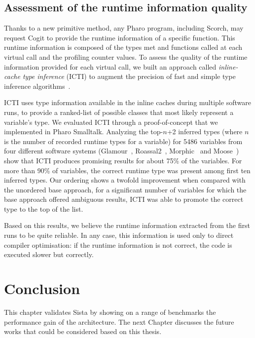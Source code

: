 \documentclass[a4paper,12pt,twoside]{../includes/ThesisStyle}
\begin{document}
\subsection{Assessment of the runtime information quality}

Thanks to a new primitive method, any Pharo program, including Scorch, may request Cogit to provide the runtime information of a specific function. This runtime information is composed of the types met and functions called at each virtual call and the profiling counter values. To assess the quality of the runtime information provided for each virtual call, we built an approach called \emph{inline-cache type inference} (ICTI) to augment the precision of fast and simple type inference algorithms~\cite{Milo16a}. 

ICTI uses type information available in the inline caches during multiple software runs, to provide a ranked-list of possible classes that most likely represent a variable's type. We evaluated ICTI through a proof-of-concept that we implemented in Pharo Smalltalk. Analyzing the top-$n$+2 inferred types (where $n$ is the number of recorded runtime types for a variable) for 5486 variables from four different software systems (Glamour~\cite{Bung09a}, Roassal2~\cite{Pena13a}, Morphic~\cite{Fern07y} and Moose~\cite{Girb10a, Duca05a, Duca00b}) show that ICTI produces promising results for about 75\% of the variables. For more than 90\% of variables, the correct runtime type was present among first ten inferred types. Our ordering shows a twofold improvement when compared with the unordered base approach, \ie for a significant number of variables for which the base approach offered ambiguous results, ICTI was able to promote the correct type to the top of the list.

Based on this results, we believe the runtime information extracted from the first runs to be quite reliable. In any case, this information is used only to direct compiler optimisation: if the runtime information is not correct, the code is executed slower but correctly.


\section*{Conclusion}

This chapter validates Sista by showing on a range of benchmarks the performance gain of the architecture. The next Chapter discusses the future works that could be considered based on this thesis.

\ifx\wholebook\relax\else
    
\end{document}

